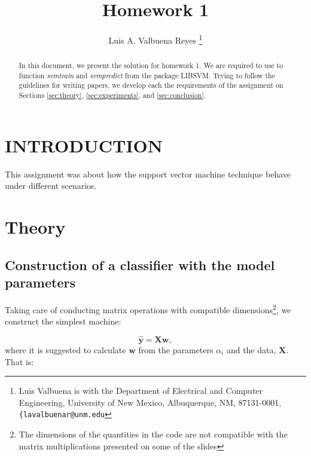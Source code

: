 \documentclass[letterpaper, 10 pt, conference]{ieeeconf}  %
\title{\LARGE \bf
Homework 1 
}
\author{Luis A. Valbuena Reyes%
\thanks{Luis Valbuena is with the Department of Electrical and Computer Engineering,
        University of New Mexico, Albuquerque, NM, 87131-0001, {\tt\small \{lavalbuenar@unm.edu}}%
}
\begin{document}
\newtheorem{theoremMyThesis}{Theorem}
\newtheorem{corollary}{Corollary}
\newtheorem{problemStatement}{Problem Statement}

\maketitle
\thispagestyle{empty}
\pagestyle{empty}


\begin{abstract}

In this document, we present the solution for homework 1. We are required to use to function \emph{svmtrain} and \emph{svmpredict}
from the package LIBSVM. Trying to follow the guidelines for writing papers, we develop each the requirements of the assignment on Sections \ref{sec:theory}, \ref{sec:experiments}, and \ref{sec:conclusion}.
\end{abstract}



\section{INTRODUCTION}
\label{sec:Intro}

This assignment was about how the support vector machine technique behave under different scenarios.


\section{Theory}
\label{sec:theory}

\subsection{Construction of a classifier with the model parameters}
\label{sec:TheoryConstructionClassifierModelParameters}

Taking care of conducting matrix operations with compatible dimensions\footnote{The dimensions of the quantities 
in the code are not compatible with the matrix multiplications presented on some of the slides}, we construct the 
simplest machine:

\begin{equation*}
    \hat{\mathbf{y}} = \mathbf{Xw},
\end{equation*}
where it is suggested to calculate $\mathbf{w}$ from the parameters $\alpha_{i}$ and the data, $\mathbf{X}$. That is:
                          
\end{document}
